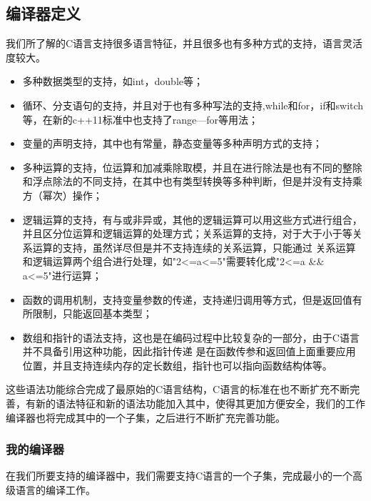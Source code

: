 \documentclass[UTF8]{ctexart}
\begin{document}
\subsection{编译器定义}
我们所了解的C语言支持很多语言特征，并且很多也有多种方式的支持，语言灵活度较大。
\begin{itemize}
    \item 多种数据类型的支持，如int，double等；
    \item 循环、分支语句的支持，并且对于也有多种写法的支持,while和for，if和switch等，在新的c++11标准\cite{c11}中也支持了range—for等用法；
    \item 变量的声明支持，其中也有常量，静态变量等多种声明方式的支持；
    \item 多种运算的支持，位运算和加减乘除取模，并且在进行除法是也有不同的整除和浮点除法的不同支持，在其中也有类型转换等多种判断，但是并没有支持乘方（幂次）操作；
    \item 逻辑运算的支持，有与或非异或，其他的逻辑运算可以用这些方式进行组合，并且区分位运算和逻辑运算的处理方式；关系运算的支持，对于大于小于等关系运算的支持，虽然详尽但是并不支持连续的关系运算，只能通过
关系运算和逻辑运算两个组合进行处理，如"2<=a<=5"需要转化成"2<=a \&\& a<=5"进行运算；
    \item 函数的调用机制，支持变量参数的传递，支持递归调用等方式，但是返回值有所限制，只能返回基本类型；
    \item 数组和指针的语法支持，这也是在编码过程中比较复杂的一部分，由于C语言并不具备引用这种功能，因此指针传递
是在函数传参和返回值上面重要应用位置，并且支持连续内存的定长数组，指针也可以指向函数结构体等。
\end{itemize}
    这些语法功能综合完成了最原始的C语言结构，C语言的标准在也不断扩充不断完善，有新的语法特征和新的语法功能加入其中，使得其更加方便安全，我们的工作
    编译器也将完成其中的一个子集，之后进行不断扩充完善功能。

\subsubsection{我的编译器}
    在我们所要支持的编译器中，我们需要支持C语言的一个子集，完成最小的一个高级语言的编译工作。
\end{document}
